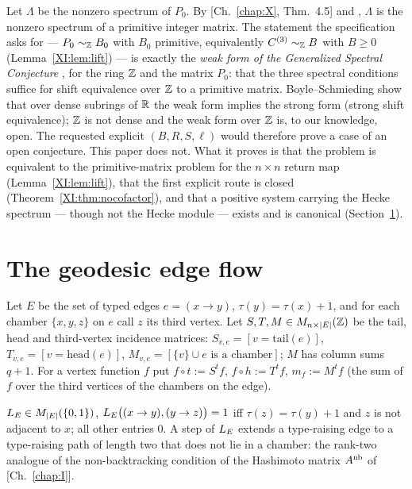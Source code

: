 \begin{remark}\label{XI:rem:status}
Let $\Lambda$ be the nonzero spectrum of $P_0$. By [Ch.~\ref{chap:X}, Thm.~4.5] and \cite{KOR}, $\Lambda$ is
the nonzero spectrum of a primitive integer matrix. The statement the specification asks
for --- $P_0\sim_{\mathbb{Z}} B_0$ with $B_0$ primitive, equivalently $C^{(3)}\sim_{\mathbb{Z}} B$ with $B\ge0$
(Lemma~\ref{XI:lem:lift}) --- is exactly the \emph{weak form of the Generalized Spectral
Conjecture} \cite[p.~253]{BH91}, \cite[p.~124]{BH93} for the ring $\mathbb{Z}$ and the matrix $P_0$:
that the three spectral conditions suffice for shift equivalence over $\mathbb{Z}$ to a primitive
matrix. Boyle--Schmieding \cite{BS} show that over dense subrings of $\mathbb{R}$ the weak form
implies the strong form (strong shift equivalence); $\mathbb{Z}$ is not dense and the weak form over
$\mathbb{Z}$ is, to our knowledge, open. The requested explicit $(B,R,S,\ell)$ would therefore prove
a case of an open conjecture. This paper does not. What it proves is that the problem is
equivalent to the primitive-matrix problem for the $n\times n$ return map
(Lemma~\ref{XI:lem:lift}), that the first explicit route is closed
(Theorem~\ref{XI:thm:nocofactor}), and that a positive system carrying the Hecke spectrum ---
though not the Hecke module --- exists and is canonical (Section~\ref{XI:sec:edge}).
\end{remark}

\section{The geodesic edge flow}\label{XI:sec:edge}

Let $E$ be the set of typed edges $e=(x\to y)$, $\tau(y)=\tau(x)+1$, and for each
chamber $\{x,y,z\}$ on $e$ call $z$ its third vertex. Let $S,T,M\in M_{n\times|E|}(\mathbb{Z})$ be the
tail, head and third-vertex incidence matrices: $S_{v,e}=[v=\text{tail}(e)]$,
$T_{v,e}=[v=\text{head}(e)]$, $M_{v,e}=[\{v\}\cup e\text{ is a chamber}]$; $M$ has column
sums $q+1$. For a vertex function $f$ put $f\circ t:=S^{t}f$, $f\circ h:=T^{t}f$,
$m_f:=M^{t}f$ (the sum of $f$ over the third vertices of the chambers on the edge).

\begin{definition}\label{XI:def:LE}
$L_E\in M_{|E|}(\{0,1\})$, $L_E\bigl((x\to y),(y\to z)\bigr)=1$ iff $\tau(z)=\tau(y)+1$ and
$z$ is not adjacent to $x$; all other entries $0$. A step of $L_E$ extends a type-raising
edge to a type-raising path of length two that does not lie in a chamber: the rank-two
analogue of the non-backtracking condition of the Hashimoto matrix $A^{\mathrm{nb}}$ of [Ch.~\ref{chap:I}].
\end{definition}

